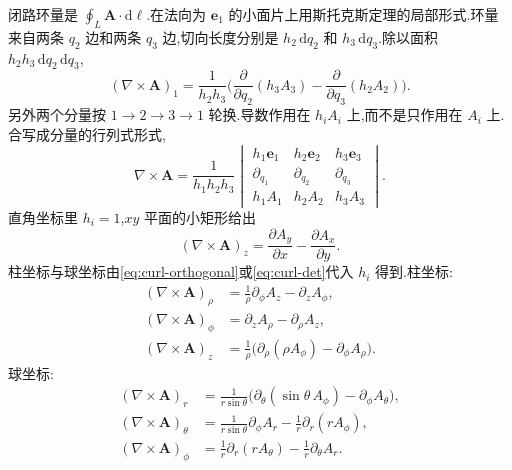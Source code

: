 闭路环量是 $\oint_L\mathbf{A}\cdot\mathrm{d}\boldsymbol{\ell}$.在法向为 $\mathbf{e}_1$ 的小面片上用斯托克斯定理的局部形式.环量来自两条 $q_2$ 边和两条 $q_3$ 边,切向长度分别是 $h_2\,\mathrm{d}q_2$ 和 $h_3\,\mathrm{d}q_3$.除以面积 $h_2 h_3\,\mathrm{d}q_2\,\mathrm{d}q_3$,
\begin{equation}
  (\nabla\times\mathbf{A})_1
  =\frac{1}{h_2 h_3}
    \Biggl(
      \frac{\partial}{\partial q_2}(h_3 A_3)
      -\frac{\partial}{\partial q_3}(h_2 A_2)
    \Biggr).
  \label{eq:curl-orthogonal}
\end{equation}
另外两个分量按 $1\to 2\to 3\to 1$ 轮换.导数作用在 $h_i A_i$ 上,而不是只作用在 $A_i$ 上.合写成分量的行列式形式,
\begin{equation}
  \nabla\times\mathbf{A}
  =\frac{1}{h_1 h_2 h_3}
    \begin{vmatrix}
      h_1\mathbf{e}_1 & h_2\mathbf{e}_2 & h_3\mathbf{e}_3 \\
      \partial_{q_1} & \partial_{q_2} & \partial_{q_3} \\
      h_1 A_1 & h_2 A_2 & h_3 A_3
    \end{vmatrix}.
  \label{eq:curl-det}
\end{equation}
直角坐标里 $h_i=1$,$xy$ 平面的小矩形给出
\begin{equation}
  (\nabla\times\mathbf{A})_z
  =\frac{\partial A_y}{\partial x}-\frac{\partial A_x}{\partial y}.
\end{equation}
柱坐标与球坐标由\eqref{eq:curl-orthogonal}或\eqref{eq:curl-det}代入 $h_i$ 得到.柱坐标:
\begin{align}
  (\nabla\times\mathbf{A})_{\rho}
  &=\frac{1}{\rho}\partial_{\phi}A_z-\partial_z A_{\phi},\\
  (\nabla\times\mathbf{A})_{\phi}
  &=\partial_z A_{\rho}-\partial_{\rho}A_z,\\
  (\nabla\times\mathbf{A})_z
  &=\frac{1}{\rho}\bigl(\partial_{\rho}(\rho A_{\phi})-\partial_{\phi}A_{\rho}\bigr).
\end{align}
球坐标:
\begin{align}
  (\nabla\times\mathbf{A})_r
  &=\frac{1}{r\sin\theta}
    \bigl(\partial_{\theta}(\sin\theta\, A_{\phi})-\partial_{\phi}A_{\theta}\bigr),\\
  (\nabla\times\mathbf{A})_{\theta}
  &=\frac{1}{r\sin\theta}\partial_{\phi}A_r-\frac{1}{r}\partial_r(r A_{\phi}),\\
  (\nabla\times\mathbf{A})_{\phi}
  &=\frac{1}{r}\partial_r(r A_{\theta})-\frac{1}{r}\partial_{\theta}A_r.
\end{align}

